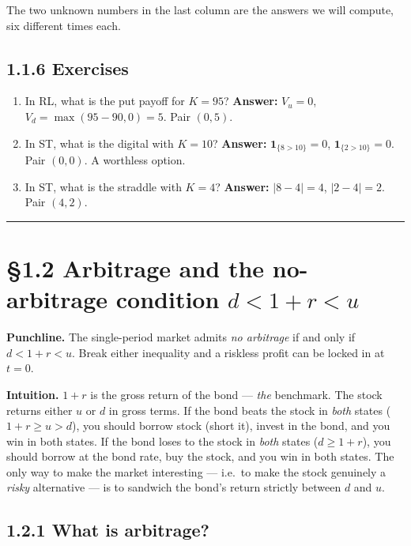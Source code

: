 \documentclass[
  10pt,
  twoside]{book}
\providecommand{\tightlist}{%
  \setlength{\itemsep}{0pt}\setlength{\parskip}{0pt}}
\begin{document}
The two unknown numbers in the last column are the answers we will
compute, six different times each.

\subsection{1.1.6 Exercises}\label{exercises-11}

\begin{enumerate}
\def\labelenumi{\arabic{enumi}.}
\tightlist
\item
  In RL, what is the put payoff for \(K=95\)? \textbf{Answer:}
  \(V_u=0\), \(V_d=\max(95-90,0)=5\). Pair \((0,5)\).
\item
  In ST, what is the digital with \(K=10\)? \textbf{Answer:}
  \(\mathbf{1}_{\{8>10\}}=0\), \(\mathbf{1}_{\{2>10\}}=0\). Pair
  \((0,0)\). A worthless option.
\item
  In ST, what is the straddle with \(K=4\)? \textbf{Answer:}
  \(|8-4|=4\), \(|2-4|=2\). Pair \((4,2)\).
\end{enumerate}

\begin{center}\rule{0.5\linewidth}{0.5pt}\end{center}

\section{\texorpdfstring{§1.2 Arbitrage and the no-arbitrage condition
\(d < 1+r < u\)}{§1.2 Arbitrage and the no-arbitrage condition d \textless{} 1+r \textless{} u}}\label{arbitrage-and-the-no-arbitrage-condition-d-1r-u}

\textbf{Punchline.} The single-period market admits \emph{no arbitrage}
if and only if \(d < 1+r < u\). Break either inequality and a riskless
profit can be locked in at \(t=0\).

\textbf{Intuition.} \(1+r\) is the gross return of the bond ---
\emph{the} benchmark. The stock returns either \(u\) or \(d\) in gross
terms. If the bond beats the stock in \emph{both} states
(\(1+r \ge u > d\)), you should borrow stock (short it), invest in the
bond, and you win in both states. If the bond loses to the stock in
\emph{both} states (\(d \ge 1+r\)), you should borrow at the bond rate,
buy the stock, and you win in both states. The only way to make the
market interesting --- i.e.~to make the stock genuinely a \emph{risky}
alternative --- is to sandwich the bond's return strictly between \(d\)
and \(u\).

\subsection{1.2.1 What is arbitrage?}\label{what-is-arbitrage}
\end{document}
